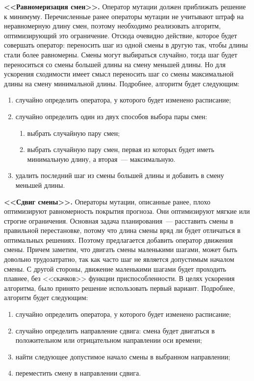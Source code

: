 \documentclass[times,specification,annotation]{itmo-student-thesis}
\begin{document}
\textbf{<<Равномеризация смен>>.}
Оператор мутации должен приближать решение к минимуму.
Перечисленные ранее операторы мутации не учитывают штраф на неравномерную длину смен, поэтому необходимо реализовать алгоритм, оптимизирующий это ограничение.
Отсюда очевидно действие, которое будет совершать оператор: переносить шаг из одной смены в другую так, чтобы длины стали более равномерны.
Смены могут выбираться случайно, тогда шаг будет переноситься со смены большей длины на смену меньшей длины.
Но для ускорения сходимости имеет смысл переносить шаг со смены максимальной длины на смену минимальной длины.
Подробнее, алгоритм будет следующим:

\begin{enumerate}
    \item случайно определить оператора, у которого будет изменено расписание;
    \item случайно определить один из двух способов выбора пары смен:
    \begin{enumerate}
        \item выбрать случайную пару смен;
        \item выбрать случайную пару смен, первая из которых будет иметь минимальную длину, а вторая~--- максимальную.
    \end{enumerate}
    \item удалить последний шаг из смены большей длины и добавить в смену меньшей длины.
\end{enumerate}

\textbf{<<Сдвиг смены>>.}
Операторы мутации, описанные ранее, плохо оптимизируют равномерность покрытия прогноза.
Они оптимизируют мягкие или строгие ограничения.
Основная задача планирования~--- расставить смены в правильной перестановке, потому что длина смены вряд ли будет отличаться в оптимальных решениях.
Поэтому предлагается добавить оператор движения смены.
Причем заметим, что двигать смены маленькими шагами, может быть довольно трудозатратно, так как часто шаг не является допустимым началом смены.
С другой стороны, движение маленькими шагами будет проходить плавнее, без <<скачков>> функции приспособленности.
В целях ускорения алгоритма, было принято решение использовать первый вариант.
Подробнее, алгоритм будет следующим:

\begin{enumerate}
    \item случайно определить оператора, у которого будет изменено расписание;
    \item случайно определить направление сдвига: смена будет двигаться в положительном или отрицательном направлении оси времени;
    \item найти следующее допустимое начало смены в выбранном направлении;
    \item переместить смену в направлении сдвига.
\end{enumerate}
\end{document}
